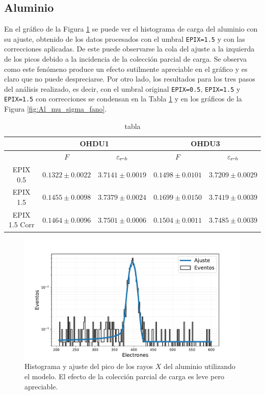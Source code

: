 \subsection{Aluminio}
\noindent En el gráfico de la Figura \ref{fig:Al_OHDU1_EPIX15_Corr} se puede ver el histograma de carga del aluminio con su ajuste, obtenido de los datos procesados con el umbral \verb|EPIX=1.5| y con las correcciones aplicadas. De este puede observarse la cola del ajuste a la izquierda de los picos debido a la incidencia de la colección parcial de carga. Se observa como este fenómeno produce un efecto sutilmente apreciable en el gráfico y es claro que no puede despreciarse. Por otro lado, los resultados para los tres pasos del análisis realizado, es decir, con el umbral original \verb|EPIX=0.5|, \verb|EPIX=1.5| y \verb|EPIX=1.5| con correcciones se condensan en la Tabla \ref{tab:Al_FanoEehOHDU1y3} y en los gráficos de la Figura \ref{fig:Al_mu_sigma_fano}.
\begin{table}[h]
\centering
\begin{tabular}{@{}ccccc@{}}
\toprule
                & \multicolumn{2}{c}{OHDU1}                 & \multicolumn{2}{c}{OHDU3}                 \\ \hline\hline
                & $F$                 & $\varepsilon_{e\mbox{-}h}$ & $F$                 & $\varepsilon_{e\mbox{-}h}$ \\
EPIX 0.5 & $0.1322 \pm 0.0022$ & $3.7141 \pm 0.0019$ & $0.1498 \pm 0.0101$ & $3.7209 \pm 0.0029$ \\ 
EPIX 1.5 & $0.1455 \pm 0.0098$ & $3.7379 \pm 0.0024$ & $0.1699 \pm 0.0150$ & $3.7419 \pm 0.0039$ \\ 
EPIX 1.5 Corr & $0.1464 \pm 0.0096$ & $3.7501 \pm 0.0006$ & $0.1504 \pm 0.0011$ & $3.7485 \pm 0.0039$ \\ \bottomrule \hline
\end{tabular}
\caption{tabla}
\label{tab:Al_FanoEehOHDU1y3}
\end{table}

\begin{figure}[h]
    \centering
        \includegraphics[scale=0.5]{Figs/HistFit_100c_EPIX15_OHDU1_Corr.pdf}
    \caption{\footnotesize{Histograma y ajuste del pico de los rayos $X$ del aluminio utilizando el modelo. El efecto de la colección parcial de carga es leve pero apreciable.}}
    \label{fig:Al_OHDU1_EPIX15_Corr}
\end{figure}


